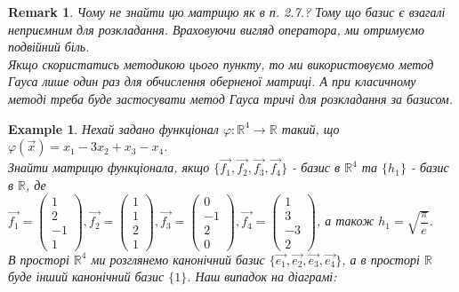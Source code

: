 \documentclass[a4paper, 10pt]{article}
\theoremstyle{theoremdd}
\newtheorem{example}[theorem]{Example}
\newtheorem{remark}[theorem]{Remark}
\begin{document}
\begin{remark}
Чому не знайти цю матрицю як в п. 2.7.? Тому що базис є взагалі неприємним для розкладання. Враховуючи вигляд оператора, ми отримуємо подвійний біль.\\
Якщо скористатись методикою цього пункту, то ми використовуємо метод Гауса лише один раз для обчислення оберненої матриці. А при класичному методі треба буде застосувати метод Гауса тричі для розкладання за базисом.
\end{remark}

\begin{example}
Нехай задано функціонал $\varphi: \mathbb{R}^4 \to \mathbb{R}$ такий, що\\
$\varphi(\vec{x}) = x_1 - 3x_2 + x_3 - x_4$.\\
Знайти матрицю функціонала, якщо $\{\vec{f_1},\vec{f_2},\vec{f_3},\vec{f_4} \}$ - базис в $\mathbb{R}^4$ та $\{ h_1 \}$ - базис в $\mathbb{R}$, де\\
$\vec{f_1} = \begin{pmatrix}
1 \\ 2 \\ -1 \\ 1
\end{pmatrix},\vec{f_2} = \begin{pmatrix}
1 \\ 1 \\ 2 \\ 1
\end{pmatrix},\vec{f_3} = \begin{pmatrix}
0 \\ -1 \\ 2 \\ 0
\end{pmatrix},\vec{f_4} = \begin{pmatrix}
1 \\ 3 \\ -3 \\ 2
\end{pmatrix}$, а також $h_1 = \sqrt{\dfrac{\pi}{e}}$.\\
В просторі $\mathbb{R}^4$ ми розглянемо канонічний базис $\{\vec{e_1},\vec{e_2},\vec{e_3},\vec{e_4}\}$, а в просторі $\mathbb{R}$ буде інший канонічний базис $\{1\}$. Наш випадок на діаграмі:\\
\end{example}
\end{document}
